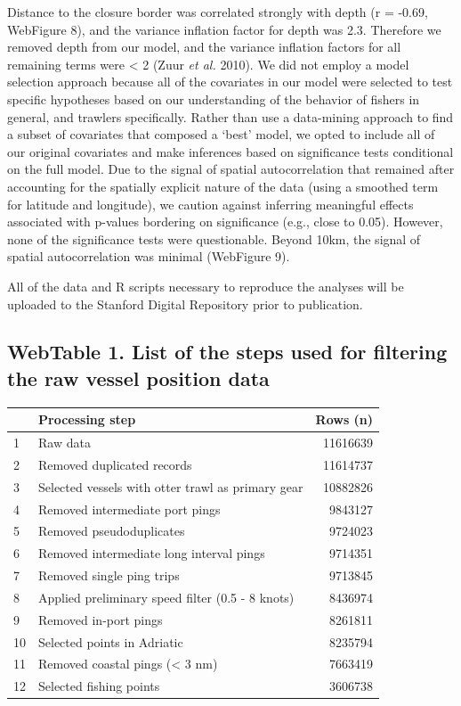 \documentclass[11pt,]{article}
\begin{document}
Distance to the closure border was correlated strongly with depth (r =
-0.69, WebFigure 8), and the variance inflation factor for depth was
2.3. Therefore we removed depth from our model, and the variance
inflation factors for all remaining terms were \textless{} 2 (Zuur
\emph{et al.} 2010). We did not employ a model selection approach
because all of the covariates in our model were selected to test
specific hypotheses based on our understanding of the behavior of
fishers in general, and trawlers specifically. Rather than use a
data-mining approach to find a subset of covariates that composed a
`best' model, we opted to include all of our original covariates and
make inferences based on significance tests conditional on the full
model. Due to the signal of spatial autocorrelation that remained after
accounting for the spatially explicit nature of the data (using a
smoothed term for latitude and longitude), we caution against inferring
meaningful effects associated with p-values bordering on significance
(e.g., close to 0.05). However, none of the significance tests were
questionable. Beyond 10km, the signal of spatial autocorrelation was
minimal (WebFigure 9).

All of the data and R scripts necessary to reproduce the analyses will
be uploaded to the Stanford Digital Repository prior to publication.

\newpage

\subsection{WebTable 1. List of the steps used for filtering the raw
vessel position
data}\label{webtable-1.-list-of-the-steps-used-for-filtering-the-raw-vessel-position-data}

\begin{longtable}[]{@{}llr@{}}
\toprule
& Processing step & Rows (n)\tabularnewline
\midrule
\endhead
1 & Raw data & 11616639\tabularnewline
2 & Removed duplicated records & 11614737\tabularnewline
3 & Selected vessels with otter trawl as primary gear &
10882826\tabularnewline
4 & Removed intermediate port pings & 9843127\tabularnewline
5 & Removed pseudoduplicates & 9724023\tabularnewline
6 & Removed intermediate long interval pings & 9714351\tabularnewline
7 & Removed single ping trips & 9713845\tabularnewline
8 & Applied preliminary speed filter (0.5 - 8 knots) &
8436974\tabularnewline
9 & Removed in-port pings & 8261811\tabularnewline
10 & Selected points in Adriatic & 8235794\tabularnewline
11 & Removed coastal pings (\textless{} 3 nm) & 7663419\tabularnewline
12 & Selected fishing points & 3606738\tabularnewline
\bottomrule
\end{longtable}
\end{document}
